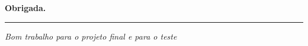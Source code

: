 \documentclass[aspectratio=169]{beamer}
\begin{document}
\begin{frame}[plain]
  \vspace*{3cm}
  \begin{center}
    \Huge\bfseries\textcolor{TextEspresso}{Obrigada.}\par
    \vspace{0.5cm}
    {\color{NudeTaupe}\rule{2cm}{0.5pt}}\par
    \vspace{0.5cm}
    \Large\textcolor{TextEspresso}{\itshape Bom trabalho para o projeto final e para o teste}
  \end{center}
\end{frame}
\end{document}

